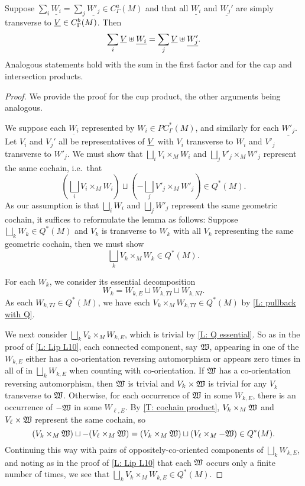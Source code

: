 \begin{proposition}\label{P: multicup}
Suppose $\sum_i \underline{W_i}=\sum_j \underline{W'_j}\in C_\Gamma^a(M)$ and that all $\underline{W_i}$ and $\underline{W_j'}$ are simply transverse to $\underline{V}\in C_\Gamma^b(M)$. Then $$\sum_i \underline{V} \uplus \underline{W_i}=\sum_j \underline{V}\uplus \underline{W'_j}.$$
Analogous statements hold with the sum in the first factor and for the cap and intersection products.
\end{proposition}
\begin{proof}
We provide the proof for the cup product, the other arguments being analogous.

We suppose each $\underline{W_i}$ represented by $W_i\in PC^*_\Gamma(M)$, and similarly for each $\underline{W'_j}$. Let $V_i$ and $V_j'$ all be representatives of $\underline{V}$ with $V_i$ transverse to $W_i$ and $V'_j$ transverse to $W'_j$. We must show that $\bigsqcup_i V_i\times_M W_i$ and $\bigsqcup_j V'_j\times_MW'_j$ represent the same cochain, i.e.\ that $$\left(\bigsqcup_i V_i\times_M W_i\right) \sqcup \left(-\bigsqcup_j V'_j\times_MW'_j\right)\in Q^*(M).$$
As our assumption is that $\bigsqcup_i W_i$ and $\bigsqcup_j W'_j$ represent the same geometric cochain, it suffices to reformulate the lemma as follows: Suppose $\bigsqcup_k W_k\in Q^*(M)$ and $V_k$ is transverse to $W_k$ with all $V_k$ representing the same geometric cochain, then we must show
 $$\bigsqcup_k V_k\times_M W_k \in Q^*(M).$$

For each $W_k$, we consider its essential decomposition $$W_k=W_{k,E}\sqcup W_{k,TI}\sqcup W_{k,NI}.$$
As each $W_{k,TI}\in Q^*(M)$, we have each $V_k\times_M W_{k,TI}\in Q^*(M)$ by \cref{L: pullback with Q}.

We next consider $\bigsqcup_k V_k\times_MW_{k,E}$, which is trivial by \cref{L: Q essential}. So as in the proof of \cref{L: Lip L10},  each connected component, say $\mathfrak W$, appearing in one of the $W_{k,E}$ either has a co-orientation reversing automorphism or appears  zero times in all of in $\bigsqcup_k W_{k,E}$ when counting with co-orientation. If $\mathfrak W$ has  a co-orientation reversing automorphism, then $\mathfrak W$ is trivial and $V_k\times \mathfrak W$ is trivial for any $V_k$ transverse to $\mathfrak W$. Otherwise, for each occurrence of $\mathfrak W$ in some $W_{k,E}$, there is an occurrence of $-\mathfrak W$ in some $W_{\ell,E}$. By \cref{T: cochain product}, $V_k\times_M\mathfrak W$ and $V_\ell\times \mathfrak W$ represent the same cochain, so
$$(V_k\times_M\mathfrak W)\sqcup -(V_\ell\times_M\mathfrak W)=(V_k\times_M\mathfrak W)\sqcup(V_\ell\times_M-\mathfrak W)\in Q^*(M).$$
Continuing this way with pairs of oppositely-co-oriented components of $\bigsqcup_k W_{k,E}$, and noting as in the proof of \cref{L: Lip L10} that each $\mathfrak W$ occurs only a finite number of times, we see that $\bigsqcup_k V_k\times_MW_{k,E}\in Q^*(M)$.


\end{proof}
